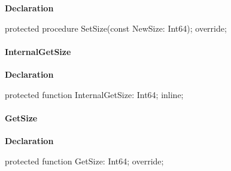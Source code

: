 \documentclass{report}
\newif\ifpdf
\begin{document}
\label{PasDoc_StreamUtils.TBufferedStream-SetSize}
\begin{list}{}{
\setlength{\itemindent}{0cm}
\setlength{\listparindent}{0cm}
\setlength{\leftmargin}{\evensidemargin}
\addtolength{\leftmargin}{\tmplength}
\settowidth{\labelsep}{X}
\addtolength{\leftmargin}{\labelsep}
\setlength{\labelwidth}{\tmplength}
}
\item[\textbf{Declaration}\hfill]
\ifpdf
\begin{flushleft}
\fi
\begin{ttfamily}
protected procedure SetSize(const NewSize: Int64); override;\end{ttfamily}

\ifpdf
\end{flushleft}
\fi

\end{list}
\paragraph*{InternalGetSize}\hspace*{\fill}

\label{PasDoc_StreamUtils.TBufferedStream-InternalGetSize}
\begin{list}{}{
\setlength{\itemindent}{0cm}
\setlength{\listparindent}{0cm}
\setlength{\leftmargin}{\evensidemargin}
\addtolength{\leftmargin}{\tmplength}
\settowidth{\labelsep}{X}
\addtolength{\leftmargin}{\labelsep}
\setlength{\labelwidth}{\tmplength}
}
\item[\textbf{Declaration}\hfill]
\ifpdf
\begin{flushleft}
\fi
\begin{ttfamily}
protected function InternalGetSize: Int64; inline;\end{ttfamily}

\ifpdf
\end{flushleft}
\fi

\end{list}
\paragraph*{GetSize}\hspace*{\fill}

\label{PasDoc_StreamUtils.TBufferedStream-GetSize}
\begin{list}{}{
\setlength{\itemindent}{0cm}
\setlength{\listparindent}{0cm}
\setlength{\leftmargin}{\evensidemargin}
\addtolength{\leftmargin}{\tmplength}
\settowidth{\labelsep}{X}
\addtolength{\leftmargin}{\labelsep}
\setlength{\labelwidth}{\tmplength}
}
\item[\textbf{Declaration}\hfill]
\ifpdf
\begin{flushleft}
\fi
\begin{ttfamily}
protected function GetSize: Int64; override;\end{ttfamily}

\ifpdf
\end{flushleft}
\fi

\end{list}
\end{document}
